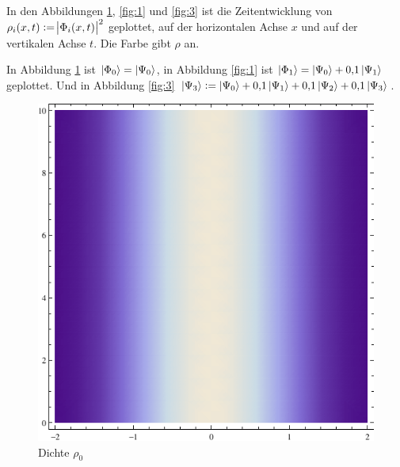 In den Abbildungen \ref{fig:0}, \ref{fig:1} und \ref{fig:3} ist die
Zeitentwicklung von $\rho_i(x, t) := \abs{\Phi_i(x, t)}^2$ geplottet, auf der
horizontalen Achse $x$ und auf der vertikalen Achse $t$. Die Farbe gibt $\rho$
an.

In Abbildung \ref{fig:0} ist $\left| \Phi_0 \right\rangle = \left| \Psi_0 \right\rangle$, in Abbildung
\ref{fig:1} ist $\left| \Phi_1 \right\rangle = \left| \Psi_0 \right\rangle + \num{0.1} \left| \Psi_1 \right\rangle$
geplottet. Und in Abbildung \ref{fig:3} $\left| \Psi_3 \right\rangle := \left| \Psi_0 \right\rangle +
\num{0.1} \left| \Psi_1 \right\rangle + \num{0.1} \left| \Psi_2 \right\rangle + \num{0.1} \left| \Psi_3 \right\rangle$.

\begin{figure}
	\begin{minipage}[t]{0.3\linewidth}
		\includegraphics[width=\textwidth]{H3-0.pdf}
		\caption{Dichte $\rho_0$}
		\label{fig:0}
	\end{minipage}
	\hfill
	\begin{minipage}[t]{0.3\linewidth}

\end{minipage}
\end{figure}
